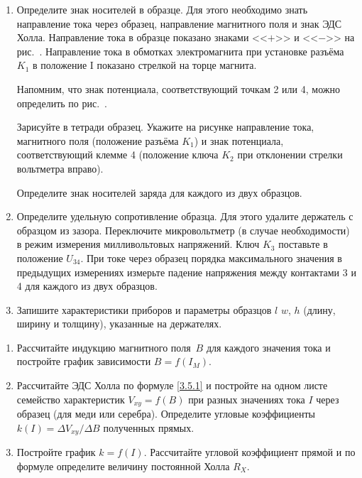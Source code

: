 \begin{lab:task}
\begin{enumerate}
{При максимальном токе через образец проведите измерения $U=f(I_{M})$ при другом направлении магнитного поля.

Для образца из цинка снимите зависимость $U=f(I_{M})$ при одном значении тока через образец.}

\item{Определите знак носителей в образце. Для этого необходимо знать направление тока через образец, направление магнитного поля и знак ЭДС Холла. Направление тока в образце показано знаками <<$+$>> и <<$-$>> на рис.~. Направление тока в обмотках электромагнита при установке разъёма $K_1$ в положение I показано стрелкой на торце магнита.

Напомним, что знак потенциала, соответствующий точкам 2 или 4, можно определить по рис.~.

Зарисуйте в тетради образец. Укажите на рисунке направление тока, магнитного поля (положение разъёма $K_1$) и знак
потенциала, соответствующий клемме 4 (положение ключа $K_2$ при отклонении стрелки вольтметра вправо).

Определите знак носителей заряда для каждого из двух образцов.}
\item{Определите удельную сопротивление образца. Для этого удалите держатель с образцом из зазора. Переключите микровольтметр (в случае необходимости) в режим измерения милливольтовых напряжений. Ключ $K_3$ поставьте в положение $U_{34}$. При токе через образец порядка максимального значения в предыдущих измерениях измерьте падение напряжения между контактами 3 и 4 для каждого из двух образцов.}

\item{ Запишите характеристики приборов и параметры образцов $l$ $w$, $h$ (длину, ширину и толщину), указанные на держателях.}
\end{enumerate}

\begin{enumerate}
\item{Рассчитайте индукцию магнитного поля~$B$ для каждого значения тока и постройте график зависимости $B=f(I_{M})$.}

\item{Рассчитайте ЭДС Холла по формуле \eqref{3.5.1} и постройте на одном листе семейство характеристик $V_{xy}=f(B)$ при разных значениях тока $I$ через образец (для меди или серебра). Определите угловые коэффициенты $k(I)=\Delta V_{xy}/\Delta B$ полученных прямых.}

\item{ Постройте график $k=f(I)$. Рассчитайте угловой коэффициент прямой и по формуле  определите величину постоянной Холла $R_X$.

}
\end{enumerate}
\end{lab:task}

